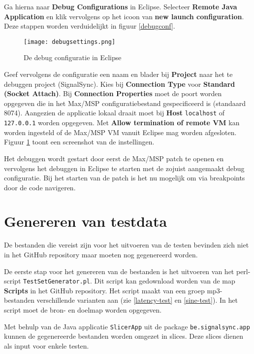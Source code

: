 Ga hierna naar \textbf{Debug Configurations} in Eclipse. Selecteer \textbf{Remote Java Application} en klik vervolgens op het icoon van \textbf{new launch configuration}. Deze stappen worden verduidelijkt in figuur \ref{debugconf}.

\begin{figure}[!tbph]
	\captionsetup{width=0.7\textwidth}
	\caption{De debug configuratie in Eclipse}
	\begin{center}
		\advance\parskip0.3cm
		\texttt{[image: debugsettings.png]}
	\end{center}
	
	\label{debugsettings}
\end{figure}

Geef vervolgens de configuratie een naam en blader bij \textbf{Project} naar het te debuggen project (SignalSync). Kies bij \textbf{Connection Type} voor \textbf{Standard (Socket Attach)}. Bij \textbf{Connection Properties} moet de poort worden opgegeven die in het Max/MSP configuratiebestand gespecificeerd is (standaard 8074). Aangezien de applicatie lokaal draait moet bij \textbf{Host} \texttt{localhost} of \texttt{127.0.0.1} worden opgegeven. Met \textbf{Allow termination of remote VM} kan worden ingesteld of de Max/MSP VM vanuit Eclipse mag worden afgesloten. Figuur \ref{debugsettings} toont een screenshot van de instellingen.

Het debuggen wordt gestart door eerst de Max/MSP patch te openen en vervolgens het debuggen in Eclipse te starten met de zojuist aangemaakt debug configuratie. Bij het starten van de patch is het nu mogelijk om via breakpoints door de code navigeren.

\section*{Genereren van testdata}

De bestanden die vereist zijn voor het uitvoeren van de testen bevinden zich niet in het GitHub repository maar moeten nog gegenereerd worden. 

De eerste stap voor het genereren van de bestanden is het uitvoeren van het perl-script \texttt{TestSetGenerator.pl}. Dit script kan gedownload worden van de map \textbf{Scripts} in het GitHub repository. Het script maakt van een groep mp3-bestanden verschillende varianten aan (zie \ref{latency-test} en \ref{sine-test}). In het script moet de bron- en doelmap worden opgegeven.

Met behulp van de Java applicatie \texttt{SlicerApp} uit de package \texttt{be.signalsync.app} kunnen de gegenereerde bestanden worden omgezet in slices. Deze slices dienen als input voor enkele testen.


